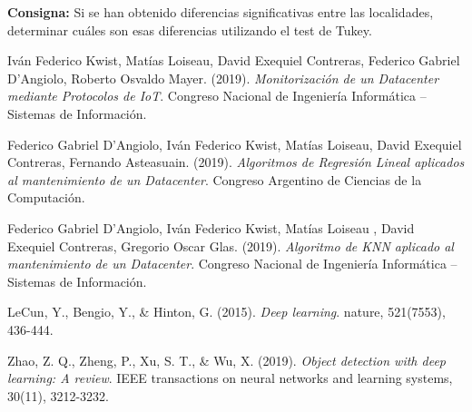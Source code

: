 \documentclass{article} %
\begin{document}
\textbf{Consigna:} Si se han obtenido diferencias significativas entre las localidades, determinar cuáles son esas diferencias utilizando el test de Tukey.





\cleardoublepage

\begin{thebibliography}{9}

Iván Federico Kwist, Matías Loiseau, David Exequiel Contreras, Federico Gabriel D’Angiolo,  Roberto Osvaldo Mayer. (2019). \textit{Monitorización de un Datacenter mediante Protocolos de IoT}. Congreso Nacional de Ingeniería Informática – Sistemas de Información.

Federico Gabriel D’Angiolo, Iván Federico Kwist, Matías Loiseau, David Exequiel Contreras, Fernando Asteasuain. (2019). \textit{Algoritmos de Regresión Lineal aplicados al mantenimiento de un Datacenter}. Congreso Argentino de Ciencias de la Computación.

Federico Gabriel D’Angiolo, Iván Federico Kwist, Matías Loiseau , David Exequiel Contreras, Gregorio Oscar Glas. (2019). \textit{Algoritmo de KNN aplicado al mantenimiento de un Datacenter}. Congreso Nacional de Ingeniería Informática – Sistemas de Información.

LeCun, Y., Bengio, Y., \& Hinton, G. (2015). \textit{Deep learning}. nature, 521(7553), 436-444.

Zhao, Z. Q., Zheng, P., Xu, S. T., \& Wu, X. (2019). \textit{Object detection with deep learning: A review}. IEEE transactions on neural networks and learning systems, 30(11), 3212-3232.

\end{thebibliography}
\end{document}
